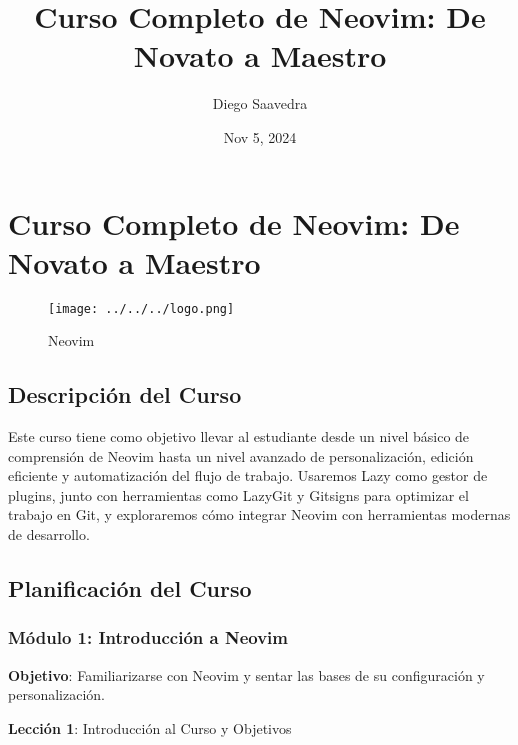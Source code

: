 \documentclass[
  a4paper,
  DIV=11,
  numbers=noendperiod,
  onepage,
  openany]{scrreprt}
\title{Curso Completo de Neovim: De Novato a Maestro}
\author{Diego Saavedra}
\date{Nov 5, 2024}
\renewcommand*\contentsname{Table of contents}
\newcommand\contentsname{Table of contents}
\begin{document}
\maketitle

\renewcommand*\contentsname{Table of contents}
{
\hypersetup{linkcolor=}
\setcounter{tocdepth}{2}
\tableofcontents
}
\chapter{Curso Completo de Neovim: De Novato a
Maestro}\label{curso-completo-de-neovim-de-novato-a-maestro}

\begin{figure}[H]

{\centering \texttt{[image: ../../../logo.png]}

}

\caption{Neovim}

\end{figure}%

\section{Descripción del Curso}\label{descripciuxf3n-del-curso}

Este curso tiene como objetivo llevar al estudiante desde un nivel
básico de comprensión de Neovim hasta un nivel avanzado de
personalización, edición eficiente y automatización del flujo de
trabajo. Usaremos Lazy como gestor de plugins, junto con herramientas
como LazyGit y Gitsigns para optimizar el trabajo en Git, y exploraremos
cómo integrar Neovim con herramientas modernas de desarrollo.

\section{Planificación del Curso}\label{planificaciuxf3n-del-curso}

\subsection{\texorpdfstring{\textbf{Módulo 1}: Introducción a
Neovim}{Módulo 1: Introducción a Neovim}}\label{muxf3dulo-1-introducciuxf3n-a-neovim}

\textbf{Objetivo}: Familiarizarse con Neovim y sentar las bases de su
configuración y personalización.

\textbf{Lección 1}: Introducción al Curso y Objetivos
\end{document}
